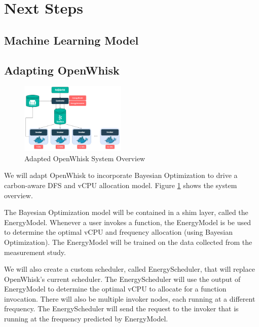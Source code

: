 \documentclass[times, 10pt,twocolumn]{article}
\begin{document}
\section{Next Steps}

\subsection{Machine Learning Model}

\subsection{Adapting OpenWhisk}

\begin{figure}[ht]
   \centering
   \includegraphics[width=0.45\textwidth]{imgs/Adapted_OW_System_Overview.png}
   \caption{Adapted OpenWhisk System Overview}
   \label{fig:adapted_ow_system_overview}
 \end{figure}

We will adapt OpenWhisk to incorporate Bayesian Optimization to drive a carbon-aware DFS and vCPU allocation model. Figure \ref{fig:adapted_ow_system_overview} shows the system overview.

The Bayesian Optimization model will be contained in a shim layer, called the EnergyModel. Whenever a user invokes a function, the EnergyModel is be used to determine the optimal vCPU and frequency allocation (using Bayesian Optimization). The EnergyModel will be trained on the data collected from the measurement study.

We will also create a custom scheduler, called EnergyScheduler, that will replace OpenWhisk's current scheduler. The EnergyScheduler will use the output of EnergyModel to determine the optimal vCPU to allocate for a function invocation. There will also be multiple invoker nodes, each running at a different frequency. The EnergyScheduler will send the request to the invoker that is running at the frequency predicted by EnergyModel.


\end{document}

